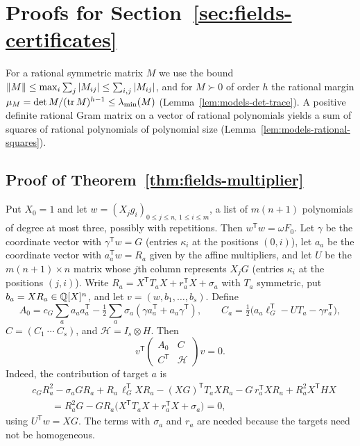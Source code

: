 \section{Proofs for Section~\ref{sec:fields-certificates}}
\label{app:fields-certificates}

For a rational symmetric matrix $M$ we use the bound
$\left\lVert M\right\rVert\le\max_i\sum_j|M_{ij}|\le\sum_{i,j}|M_{ij}|$, and for $M\succ0$ of
order $h$ the rational margin $\mu_M=\det M/(\operatorname{tr} M)^{h-1}\le\lambda_{\min}(M)$
(Lemma~\ref{lem:models-det-trace}). A positive definite rational Gram matrix on
a vector of rational polynomials yields a sum of squares of rational
polynomials of polynomial size (Lemma~\ref{lem:models-rational-squares}).

\subsection{Proof of Theorem~\ref{thm:fields-multiplier}}
\label{app:fields-multiplier}

Put $X_0=1$ and let $w=(X_jg_i)_{0\le j\le n,\,1\le i\le m}$, a list of
$m(n+1)$ polynomials of degree at most three, possibly with repetitions. Then
$w^{\mathsf T}w=\omega F_0$. Let $\gamma$ be the coordinate vector with
$\gamma^{\mathsf T}w=G$ (entries $\kappa_i$ at the positions $(0,i)$), let
$a_a$ be the coordinate vector with $a_a^{\mathsf T}w=R_a$ given by the
affine multipliers, and let $U$ be the $m(n+1)\times n$ matrix whose $j$th
column represents $X_jG$ (entries $\kappa_i$ at the positions $(j,i)$).
Write $R_a=X^{\mathsf T}T_aX+r_a^{\mathsf T}X+\sigma_a$ with $T_a$ symmetric,
put $b_a=XR_a\in\mathbb Q[X]^n$, and let $v=(w,b_1,\ldots,b_s)$. Define
\[
 A_0=c_G\sum_aa_aa_a^{\mathsf T}
   -\tfrac12\sum_a\sigma_a(\gamma a_a^{\mathsf T}+a_a\gamma^{\mathsf T}),
 \qquad
 C_a=\tfrac12\bigl(a_a\ell_G^{\mathsf T}-UT_a-\gamma r_a^{\mathsf T}\bigr),
\]
$C=(C_1\ \cdots\ C_s)$, and $\mathcal H=I_s\otimes H$. Then
\begin{equation}
 v^{\mathsf T}\begin{pmatrix}A_0&C\\C^{\mathsf T}&\mathcal H\end{pmatrix}v=0 .
 \label{eq:fields-zero-identity}
\end{equation}
Indeed, the contribution of target $a$ is
\[
\begin{aligned}
 &c_GR_a^2-\sigma_aGR_a+R_a\,\ell_G^{\mathsf T}XR_a
   -(XG)^{\mathsf T}T_aXR_a-G\,r_a^{\mathsf T}XR_a+R_a^2X^{\mathsf T}HX\\
 &\qquad=R_a^2G-GR_a\bigl(X^{\mathsf T}T_aX+r_a^{\mathsf T}X+\sigma_a\bigr)=0,
\end{aligned}
\]
using $U^{\mathsf T}w=XG$. The terms with $\sigma_a$ and $r_a$ are needed
because the targets need not be homogeneous.

